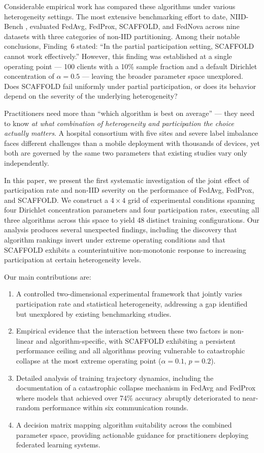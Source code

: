 \documentclass[conference]{IEEEtran}
\begin{document}
Considerable empirical work has compared these algorithms under various heterogeneity settings. The most extensive benchmarking effort to date, NIID-Bench \cite{li2022niid}, evaluated FedAvg, FedProx, SCAFFOLD, and FedNova across nine datasets with three categories of non-IID partitioning. Among their notable conclusions, Finding~6 stated: ``In the partial participation setting, SCAFFOLD cannot work effectively.'' However, this finding was established at a single operating point --- 100 clients with a 10\% sample fraction and a default Dirichlet concentration of $\alpha = 0.5$ --- leaving the broader parameter space unexplored. Does SCAFFOLD fail uniformly under partial participation, or does its behavior depend on the severity of the underlying heterogeneity?

Practitioners need more than ``which algorithm is best on average'' --- they need to know \textit{at what combination of heterogeneity and participation the choice actually matters}. A hospital consortium with five sites and severe label imbalance faces different challenges than a mobile deployment with thousands of devices, yet both are governed by the same two parameters that existing studies vary only independently.

In this paper, we present the first systematic investigation of the joint effect of participation rate and non-IID severity on the performance of FedAvg, FedProx, and SCAFFOLD. We construct a $4 \times 4$ grid of experimental conditions spanning four Dirichlet concentration parameters and four participation rates, executing all three algorithms across this space to yield 48 distinct training configurations. Our analysis produces several unexpected findings, including the discovery that algorithm rankings invert under extreme operating conditions and that SCAFFOLD exhibits a counterintuitive non-monotonic response to increasing participation at certain heterogeneity levels.

Our main contributions are:
\begin{enumerate}
    \item A controlled two-dimensional experimental framework that jointly varies participation rate and statistical heterogeneity, addressing a gap identified but unexplored by existing benchmarking studies.
    \item Empirical evidence that the interaction between these two factors is non-linear and algorithm-specific, with SCAFFOLD exhibiting a persistent performance ceiling and all algorithms proving vulnerable to catastrophic collapse at the most extreme operating point ($\alpha = 0.1$, $p = 0.2$).
    \item Detailed analysis of training trajectory dynamics, including the documentation of a catastrophic collapse mechanism in FedAvg and FedProx where models that achieved over 74\% accuracy abruptly deteriorated to near-random performance within six communication rounds.
    \item A decision matrix mapping algorithm suitability across the combined parameter space, providing actionable guidance for practitioners deploying federated learning systems.
\end{enumerate}
\end{document}
